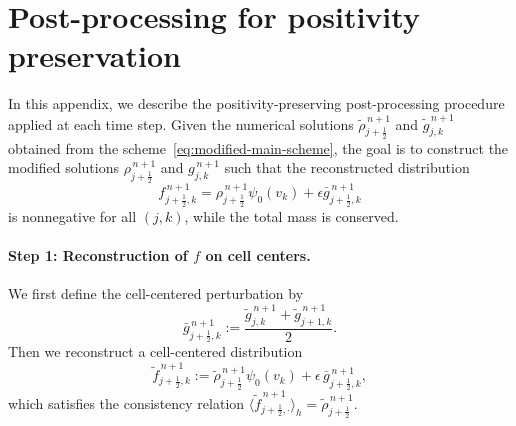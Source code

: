 \documentclass[11pt,twoside]{article}
\theoremstyle{plain}
\theoremstyle{nonumberplain}
\begin{document}
\section{Post-processing for positivity preservation}\label{sec:limiter}
In this appendix, we describe the positivity-preserving post-processing procedure applied at each time step.  
Given the numerical solutions $\tilde{\rho}_{j+\frac12}^{\,n+1}$ and $\tilde{g}_{j,k}^{\,n+1}$ obtained from the scheme~\eqref{eq:modified-main-scheme}, the goal is to construct the modified solutions $\rho_{j+\frac12}^{\,n+1}$ and $g_{j,k}^{\,n+1}$ such that the reconstructed distribution
\[
    f_{j+\frac12,k}^{\,n+1} 
    = \rho_{j+\frac12}^{\,n+1}\psi_0(v_k)
    + \epsilon \bar{g}_{j+\frac12,k}^{\,n+1}
\]
is nonnegative for all $(j,k)$, while the total mass is conserved.






\paragraph{Step 1: Reconstruction of $f$ on cell centers.}
We first define the cell-centered perturbation by
\[
    \bar{g}_{j+\frac12,k}^{\,n+1}
    := \frac{\tilde{g}_{j,k}^{\,n+1}
    + \tilde{g}_{j+1,k}^{\,n+1}}{2}.
\]
Then we reconstruct a cell-centered distribution
\[
    \tilde{f}_{j+\frac12,k}^{\,n+1}
    := \tilde{\rho}_{j+\frac12}^{\,n+1}\psi_0(v_k)
     + \epsilon\,\bar{g}_{j+\frac12,k}^{\,n+1},
\]
which satisfies the consistency relation  
$\langle \tilde{f}_{j+\frac12,\cdot}^{\,n+1}\rangle_h = \tilde{\rho}_{j+\frac12}^{\,n+1}$.
\end{document}
